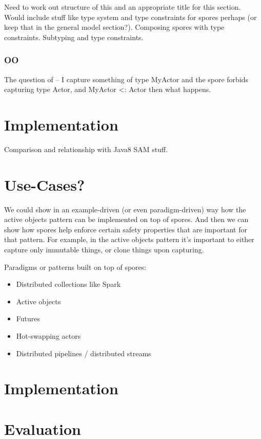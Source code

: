 \documentclass{llncs}
\begin{document}
Need to work out structure of this and an appropriate title for this section. Would include stuff like type system and type constraints for spores perhaps (or keep that in the general model section?). Composing spores with type constraints. Subtyping and type constraints.

\subsubsection{OO}

The question of -- I capture something of type MyActor
and the spore forbids capturing type Actor, and MyActor <: Actor
then what happens.

\section{Implementation}

Comparison and relationship with Java8 SAM stuff.

\section{Use-Cases?}

We could show in an example-driven (or even paradigm-driven) way how the
active objects pattern can be implemented on top of spores. And then we can
show how spores help enforce certain safety properties that are important for
that pattern. For example, in the active objects pattern it's important to
either capture only immutable things, or clone things upon capturing.

Paradigms or patterns built on top of spores:

\begin{itemize}
\item Distributed collections like Spark
\item Active objects
\item Futures
\item Hot-swapping actors
\item Distributed pipelines / distributed streams
\end{itemize}

\section{Implementation}

\section{Evaluation}
\end{document}
